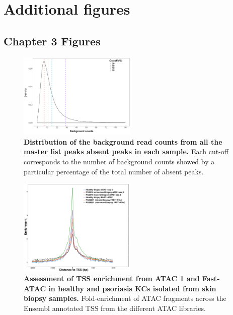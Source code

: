 \section{Additional figures}

\subsection{Chapter 3 Figures}

\begin{figure}[htbp]
\centering
\includegraphics[width=0.5\textwidth]{./Appendix/pdfs/Chapter3/ATAC_absent_peaks_noise_distribution}
\caption[Distribution of the background read counts from all the master list peaks absent in each sample.]{\textbf{Distribution of the background read counts from all the master list peaks absent peaks in each sample.} Each cut-off corresponds to the number of background counts showed by a particular percentage of the total number of absent peaks.}
\label{figure:ATAC_absent_peaks_distribution}
\end{figure}



\begin{figure}[htbp]
\centering
\includegraphics[width=0.5\textwidth]{./Appendix/pdfs/Chapter3/ATAC_skin_biopsy_samples_all_methods_TSS_enrichment_supplementary}
\caption[Assessment of TSS enrichment from ATAC 1 and Fast-ATAC in healthy and psoriasis KCs isolated from skin biopsy samples.]{\textbf{Assessment of TSS enrichment from ATAC 1 and Fast-ATAC in healthy and psoriasis KCs isolated from skin biopsy samples.} Fold-enrichment of ATAC fragments across the Ensembl annotated TSS from the different ATAC libraries.}
\label{figure:TSS_skin_biopsies}
\end{figure}



